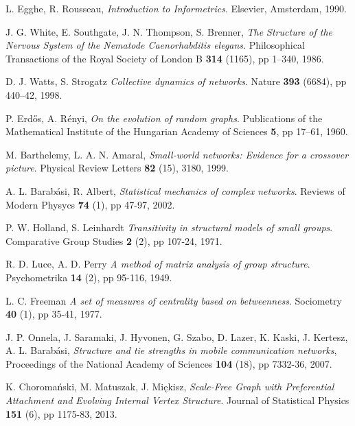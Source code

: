 \begin{thebibliography}{99}
  L. Egghe, R. Rousseau,
  \emph{Introduction to Informetrics}.
  Elsevier, Amsterdam,
  1990.

  J. G. White, E. Southgate, J. N. Thompson, S. Brenner,
  \emph{The Structure of the Nervous System of the Nematode Caenorhabditis elegans}.
  Philosophical Transactions of the Royal Society of London B \textbf{314} (1165), pp 1–340,
  1986.

  D. J. Watts, S. Strogatz
  \emph{Collective dynamics of  networks}.
  Nature \textbf{393} (6684), pp 440–42,
  1998.

  P. Erdős, A. Rényi,
  \emph{On the evolution of random graphs}.
  Publications of the Mathematical Institute of the Hungarian Academy of Sciences \textbf{5}, pp 17–61,
  1960.

  M. Barthelemy, L. A. N. Amaral,
  \emph{Small-world networks: Evidence for a crossover picture}.
  Physical Review Letters \textbf{82} (15), 3180,
  1999.

  A. L. Barabási, R. Albert,
  \emph{Statistical mechanics of complex networks}.
  Reviews of Modern Physycs \textbf{74} (1), pp 47-97,
  2002.
  
  P. W. Holland, S. Leinhardt
  \emph{Transitivity in structural models of small groups}.
  Comparative Group Studies \textbf{2} (2), pp 107-24,
  1971.

  R. D. Luce, A. D. Perry
  \emph{A method of matrix analysis of group structure}.
  Psychometrika \textbf{14} (2), pp 95-116,
  1949.

  L. C. Freeman
  \emph{A set of measures of centrality based on betweenness}.
  Sociometry \textbf{40} (1), pp 35-41,
  1977.

  J. P. Onnela, J. Saramaki, J. Hyvonen, G. Szabo, D. Lazer, K. Kaski, J. Kertesz, A. L. Barabási,
  \emph{Structure and tie strengths in mobile communication networks},
  Proceedings of the National Academy of Sciences \textbf{104} (18), pp 7332-36,
  2007.

  K. Choromański, M. Matuszak, J. Miękisz,
  \emph{Scale-Free Graph with Preferential Attachment and Evolving Internal Vertex Structure}.
  Journal of Statistical Physics \textbf{151} (6), pp 1175-83,
  2013.


\end{thebibliography}
